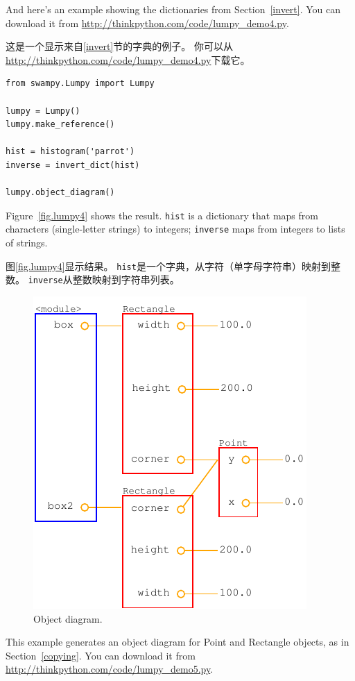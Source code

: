\documentclass[10pt]{book}
\begin{document}
\begin{CJK}{UTF8}{gbsn}
And here's an example 
showing the dictionaries from Section~\ref{invert}.  You can download
it from \url{http://thinkpython.com/code/lumpy_demo4.py}.

这是一个显示来自\ref{invert}节的字典的例子。
你可以从\url{http://thinkpython.com/code/lumpy_demo4.py}下载它。

\begin{verbatim}
from swampy.Lumpy import Lumpy

lumpy = Lumpy()
lumpy.make_reference()

hist = histogram('parrot')
inverse = invert_dict(hist)

lumpy.object_diagram()
\end{verbatim}

Figure~\ref{fig.lumpy4} shows the result.  {\tt hist} is a dictionary
that maps from characters (single-letter strings) to integers;
{\tt inverse} maps from integers to lists of strings.

图\ref{fig.lumpy4}显示结果。
{\tt hist}是一个字典，从字符（单字母字符串）映射到整数。
{\tt inverse}从整数映射到字符串列表。

\begin{figure}
\centerline
{\includegraphics[scale=0.7]{figs/lumpydemo5.pdf}}
\caption{Object diagram.}
\label{fig.lumpy5}
\end{figure}

This example generates an object diagram for Point and Rectangle
objects, as in Section~\ref{copying}.  You can download it from
\url{http://thinkpython.com/code/lumpy_demo5.py}.


\end{CJK}
\end{document}
